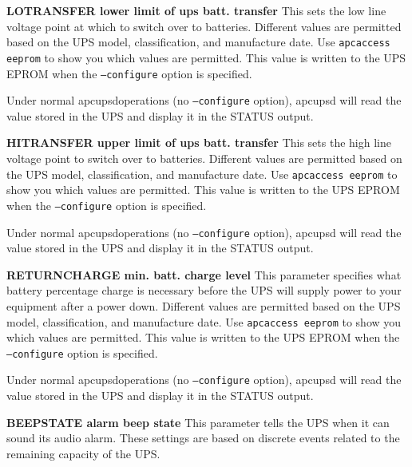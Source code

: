 \begin{description}
\item {\bf LOTRANSFER \lt{}lower limit of ups batt. transfer\gt{}}
This sets the low line voltage point at which to switch over to batteries.
Different values are permitted based on the UPS model, classification, and
manufacture date. Use {\tt apcaccess eeprom} to show you which values are
permitted. This value is written to the UPS EPROM when the {\tt --configure}
option is specified.  

Under normal apcupsdoperations (no {\tt --configure} option), apcupsd will
read the value stored in the UPS and display it in the STATUS output.  

\item {\bf HITRANSFER \lt{}upper limit of ups batt. transfer\gt{}}
This sets the high line voltage point to switch over to batteries. Different
values are permitted based on the UPS model, classification, and manufacture
date. Use {\tt apcaccess eeprom} to show you which values are permitted. This
value is written to the UPS EPROM when the {\tt --configure} option is
specified.  

Under normal apcupsdoperations (no {\tt --configure} option), apcupsd will
read the value stored in the UPS and display it in the STATUS output.  

\label{RETURNCHARGE-_003cmin_005f-batt_005f-charge-level_003e}

\item {\bf RETURNCHARGE \lt{}min. batt. charge level\gt{}}
This parameter specifies what battery percentage charge is necessary before
the UPS will supply power to your equipment after a power down. Different
values are permitted based on the UPS model, classification, and manufacture
date. Use {\tt apcaccess eeprom} to show you which values are permitted. This
value is written to the UPS EPROM when the {\tt --configure} option is
specified.  

Under normal apcupsdoperations (no {\tt --configure} option), apcupsd will
read the value stored in the UPS and display it in the STATUS output.  

\item {\bf BEEPSTATE \lt{}alarm beep state\gt{}}
This parameter tells the UPS when it can sound its audio alarm. These settings
are based on discrete events related to the remaining capacity of the UPS.  


\end{description}
